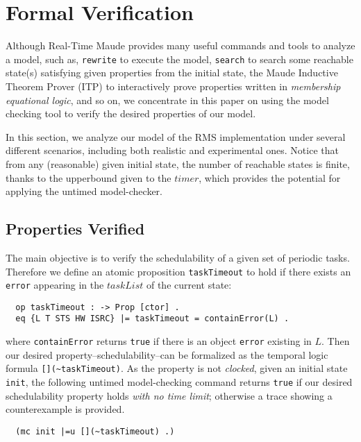 \documentclass{llncs}
\begin{document}
\section{Formal Verification}
Although Real-Time Maude provides many useful commands and tools to
analyze a model, such as, \verb|rewrite| to execute the model,
\verb|search| to search some reachable state(s) satisfying given
properties from the initial state, the Maude Inductive Theorem Prover
(ITP) to interactively prove properties written in \emph{membership
  equational logic}, and so on, we concentrate in this paper on using
the model checking tool to verify the desired properties of our model.

In this section, we analyze our model of the RMS implementation under
several different scenarios, including both realistic and experimental
ones. Notice that from any (reasonable) given initial state, the
number of reachable states is finite, thanks to the upperbound given
to the $timer$, which provides the potential for applying the untimed
model-checker.

\subsection{Properties Verified}
The main objective is to verify the schedulability of a given set of
periodic tasks. Therefore we define an atomic proposition
\verb|taskTimeout| to hold if there exists an \verb|error| appearing
in the $taskList$ of the current state:
\begin{verbatim}
  op taskTimeout : -> Prop [ctor] .
  eq {L T STS HW ISRC} |= taskTimeout = containError(L) .
\end{verbatim}
where \verb|containError| returns \verb|true| if there is an object
\verb|error| existing in $L$. Then our desired
property--schedulability--can be formalized as the temporal logic
formula \verb|[](~taskTimeout)|. As the property is not
\emph{clocked}, given an initial state \verb|init|, the following
untimed model-checking command returns \verb|true| if our desired
schedulability property holds \emph{with no time limit}; otherwise 
a trace showing a counterexample is provided.
\begin{verbatim}
  (mc init |=u [](~taskTimeout) .)
\end{verbatim}
\end{document}
